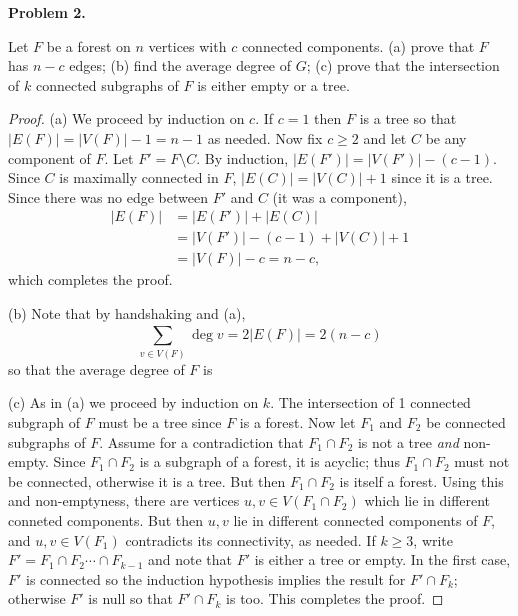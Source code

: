 \noindent\textbf{Problem 2.}

Let \( F \) be a forest on \( n \) vertices with \( c \) connected components. (a) prove that \( F \) has \( n - c \) edges; (b) find the average degree of \( G \); (c) prove that the intersection of \( k \) connected subgraphs of \( F \) is either empty or a tree.
\begin{proof} (a) We proceed by induction on \( c \). If \( c = 1 \) then \( F \) is a tree so that \( |E(F)| = |V(F)| - 1 = n - 1 \) as needed. Now fix \( c \geq 2 \) and let \( C \) be any component of \( F \). Let \( F' = F \setminus C \). By induction, \( |E(F')| = |V(F')| - (c - 1) \). Since \( C \) is maximally connected in \( F \), \( |E(C)| = |V(C)| + 1 \) since it is a tree. Since there was no edge between \( F' \) and \( C \) (it was a component),
	\begin{align*}
		|E(F)| &= |E(F')| + |E(C)| \\
		       &= |V(F')| - (c - 1) + |V(C)| + 1 \\
		       &= |V(F)| - c = n - c,
	\end{align*}
	which completes the proof.

	(b) Note that by handshaking and (a), \[ \sum_{v \in V(F)}^{} \deg v = 2 |E(F)| = 2(n - c)  \] so that the average degree of \( F \) is 

	(c) As in (a) we proceed by induction on \( k \). The intersection of 1 connected subgraph of \( F \) must be a tree since \( F \) is a forest. Now let \( F_1 \) and \( F_2 \) be connected subgraphs of \( F \). Assume for a contradiction that \( F_1 \cap F_2 \) is not a tree \emph{and} non-empty. Since \( F_1 \cap F_2 \) is a subgraph of a forest, it is acyclic; thus \( F_1 \cap F_2 \) must not be connected, otherwise it is a tree. But then \( F_1 \cap F_2 \) is itself a forest. Using this and non-emptyness, there are vertices \( u,v \in V(F_1 \cap F_2) \) which lie in different conneted components. But then \( u,v \) lie in different connected components of \( F \), and \( u,v \in V(F_1) \) contradicts its connectivity, as needed. If \( k \geq 3 \), write \( F' = F_1 \cap F_2 \cdots \cap F_{k-1}  \) and note that \( F' \) is either a tree or empty. In the first case, \( F' \) is connected so the induction hypothesis implies the result for \( F' \cap F_{k}  \); otherwise \( F' \) is null so that \( F' \cap F_{k}  \) is too. This completes the proof.
\end{proof}
